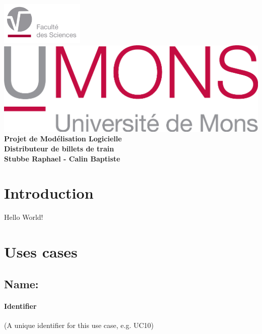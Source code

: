 \documentclass{report}
\begin{document}
\begin{titlepage}
    \includegraphics[width=4cm]{fslogo.jpg} %
    \centering
    \vfill
    \includegraphics{UMONS} %
    \vfill
    {\bfseries\Large
        Projet	de	Modélisation	Logicielle\\
        Distributeur de	billets	de train\\
        \vskip2cm
        Stubbe Raphael - Calin Baptiste\\
    }
    \vfill

    \vfill
    \vfill
\end{titlepage}

\newpage

\tableofcontents

\newpage


\section{Introduction}
  Hello World!

  \newpage
\section{Uses cases}
\subsection{Name:}


  \paragraph{Identifier}

  (A unique identifier for this use case, e.g. UC10)
\end{document}
